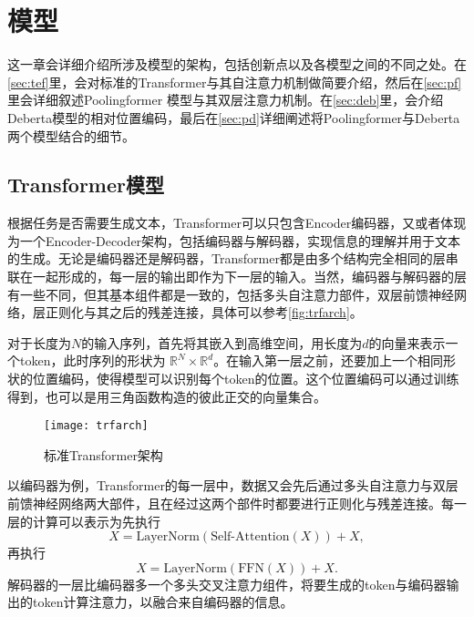 \chapter{模型}

这一章会详细介绍所涉及模型的架构，包括创新点以及各模型之间的不同之处。在\autoref{sec:tef}里，会对标准的Transformer\cite{vaswani2017attention}与其自注意力机制做简要介绍，然后在\autoref{sec:pf}里会详细叙述Poolingformer 模型与其双层注意力机制。在\autoref{sec:deb}里，会介绍Deberta\cite{he2020deberta}模型的相对位置编码，最后在\autoref{sec:pd}详细阐述将Poolingformer与Deberta两个模型结合的细节。

\section{Transformer模型}
\label{sec:tef}

根据任务是否需要生成文本，Transformer可以只包含Encoder编码器，又或者体现为一个Encoder-Decoder架构，包括编码器与解码器，实现信息的理解并用于文本的生成。无论是编码器还是解码器，Transformer都是由多个结构完全相同的层串联在一起形成的，每一层的输出即作为下一层的输入。当然，编码器与解码器的层有一些不同，但其基本组件都是一致的，包括多头自注意力部件，双层前馈神经网络，层正则化\cite{ba2016layer}与其之后的残差连接，具体可以参考\autoref{fig:trfarch}\cite{tay2020efficient}。

对于长度为$N$的输入序列，首先将其嵌入到高维空间，用长度为$d$的向量来表示一个token，此时序列的形状为 $\mathbb{R}^N \times \mathbb{R}^d$。在输入第一层之前，还要加上一个相同形状的位置编码，使得模型可以识别每个token的位置。这个位置编码可以通过训练得到，也可以是用三角函数构造的彼此正交的向量集合。

\begin{figure}
\centering
\texttt{[image: trfarch]}
\caption{标准Transformer架构}
\label{fig:trfarch}
\end{figure}

以编码器为例，Transformer的每一层中，数据又会先后通过多头自注意力与双层前馈神经网络两大部件，且在经过这两个部件时都要进行正则化与残差连接。每一层的计算可以表示为先执行
\begin{equation}
 	X=\text{LayerNorm}(\text{Self-Attention}(X))+X,
 \label{eq:trfattn}
 \end{equation}
再执行
\begin{equation}
 	X=\text{LayerNorm}(\text{FFN}(X))+X.
 \label{eq:trfffn}
 \end{equation}
解码器的一层比编码器多一个多头交叉注意力组件，将要生成的token与编码器输出的token计算注意力，以融合来自编码器的信息。

